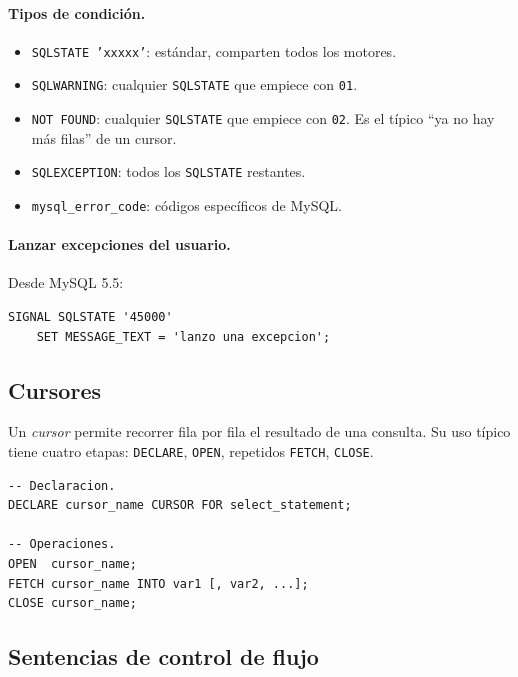 \documentclass[11pt,a4paper]{article}
\begin{document}
\paragraph{Tipos de condición.}

\begin{itemize}
    \item \texttt{SQLSTATE 'xxxxx'}: estándar, comparten todos los
    motores.
    \item \texttt{SQLWARNING}: cualquier \texttt{SQLSTATE} que empiece
    con \texttt{01}.
    \item \texttt{NOT FOUND}: cualquier \texttt{SQLSTATE} que empiece
    con \texttt{02}. Es el típico ``ya no hay más filas'' de un
    cursor.
    \item \texttt{SQLEXCEPTION}: todos los \texttt{SQLSTATE}
    restantes.
    \item \texttt{mysql\_error\_code}: códigos específicos de MySQL.
\end{itemize}

\paragraph{Lanzar excepciones del usuario.} Desde MySQL 5.5:

\begin{lstlisting}
SIGNAL SQLSTATE '45000'
    SET MESSAGE_TEXT = 'lanzo una excepcion';
\end{lstlisting}

\subsection{Cursores}

Un \emph{cursor} permite recorrer fila por fila el resultado de una
consulta. Su uso típico tiene cuatro etapas: \texttt{DECLARE},
\texttt{OPEN}, repetidos \texttt{FETCH}, \texttt{CLOSE}.

\begin{lstlisting}
-- Declaracion.
DECLARE cursor_name CURSOR FOR select_statement;

-- Operaciones.
OPEN  cursor_name;
FETCH cursor_name INTO var1 [, var2, ...];
CLOSE cursor_name;
\end{lstlisting}

\subsection{Sentencias de control de flujo}
\end{document}
